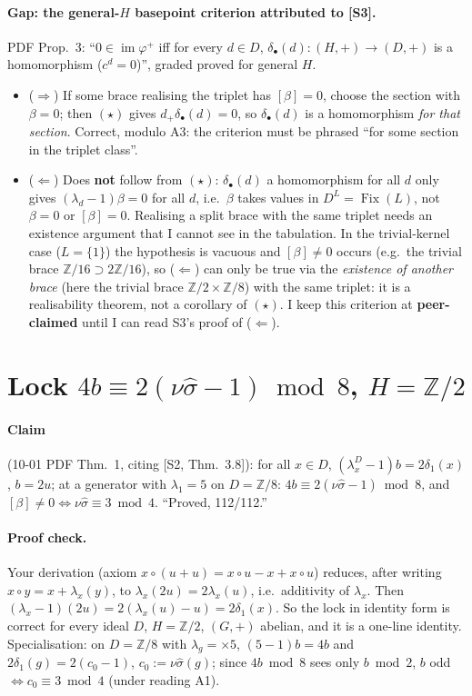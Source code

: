 \documentclass[11pt]{article}
\newcommand{\Z}{\mathbb{Z}}
\newcommand{\Fix}{\operatorname{Fix}}
\newcommand{\im}{\operatorname{im}}
\newcommand{\sh}{\hat\sigma}
\newcommand{\dplus}{d_{+}}
\begin{document}
\paragraph{Gap: the general-$H$ basepoint criterion attributed to [S3].} PDF Prop.~3:
``$0\in\im\varphi^+$ iff for every $d\in D$, $\delta_\bullet(d):(H,+)\to(D,+)$ is a
homomorphism ($c^d=0$)'', graded proved for general $H$.
\begin{itemize}[leftmargin=*]
\item ($\Rightarrow$) If some brace realising the triplet has $[\beta]=0$, choose the
section with $\beta=0$; then $(\star)$ gives $\dplus\delta_\bullet(d)=0$, so
$\delta_\bullet(d)$ is a homomorphism \emph{for that section}. Correct, modulo A3: the
criterion must be phrased ``for some section in the triplet class''.
\item ($\Leftarrow$) Does \textbf{not} follow from $(\star)$: $\delta_\bullet(d)$ a
homomorphism for all $d$ only gives $(\lambda_d-1)\beta=0$ for all $d$, i.e.\ $\beta$
takes values in $D^L=\Fix(L)$, not $\beta=0$ or $[\beta]=0$. Realising a split brace with
the same triplet needs an existence argument that I cannot see in the tabulation. In the
trivial-kernel case ($L=\{1\}$) the hypothesis is vacuous and $[\beta]\neq0$ occurs
(e.g.\ the trivial brace $\Z/16\supset2\Z/16$), so ($\Leftarrow$) can only be true via
the \emph{existence of another brace} (here the trivial brace $\Z/2\times\Z/8$) with the
same triplet: it is a realisability theorem, not a corollary of $(\star)$. I keep this
criterion at \textbf{peer-claimed} until I can read S3's proof of ($\Leftarrow$).
\end{itemize}

\section{Lock $4b\equiv2(\nu\sh-1)\bmod 8$, $H=\Z/2$}

\paragraph{Claim} (10-01 PDF Thm.~1, citing [S2, Thm.~3.8]): for all $x\in D$,
$(\lambda^D_x-1)b=2\delta_1(x)$, $b=2u$; at a generator with $\lambda_1=5$ on
$D=\Z/8$: $4b\equiv2(\nu\sh-1)\bmod8$, and $[\beta]\neq0\iff\nu\sh\equiv3\bmod4$.
``Proved, 112/112.''

\paragraph{Proof check.} Your derivation (axiom $x\circ(u+u)=x\circ u-x+x\circ u$)
reduces, after writing $x\circ y=x+\lambda_x(y)$, to $\lambda_x(2u)=2\lambda_x(u)$,
i.e.\ additivity of $\lambda_x$. Then $(\lambda_x-1)(2u)=2(\lambda_x(u)-u)=2\delta_1(x)$.
So the lock in identity form is correct for every ideal $D$, $H=\Z/2$, $(G,+)$ abelian,
and it is a one-line identity. Specialisation: on $D=\Z/8$ with $\lambda_g=\times5$,
$(5-1)b=4b$ and $2\delta_1(g)=2(c_0-1)$, $c_0:=\nu\sh(g)$; since $4b\bmod8$ sees only
$b\bmod2$, $b$ odd $\iff c_0\equiv3\bmod4$ (under reading A1).
\end{document}

